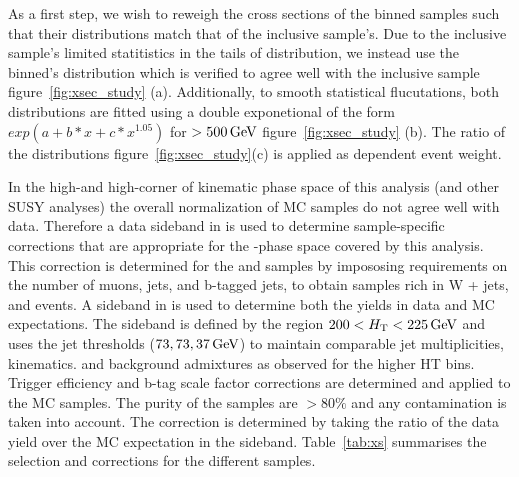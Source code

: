 
As a first step, we wish to reweigh the cross sections of the \partonht binned samples such that
their \partonht distributions match that of the inclusive sample's. Due to
the inclusive sample's limited statitistics in the tails of \scalht distribution, 
we instead use the \nparton binned's \partonht distribution which is verified to agree well 
with the inclusive sample figure~\ref{fig:xsec_study} (a).  Additionally, to smooth statistical
flucutations, both distributions are fitted using a double exponetional of the form $exp(a+b*x + c*x^{1.05})$
for \scalht $> 500\,\text{Ge\hspace{-.08em}V}$ figure~\ref{fig:xsec_study} (b). The ratio of the distributions figure~\ref{fig:xsec_study}(c) 
is applied as \partonht dependent event weight.

In the high-\scalht and high-\met corner of kinematic phase space of this analysis 
(and other SUSY analyses) the overall normalization of MC samples do not 
agree well with data. Therefore a data sideband in \scalht is used
to determine sample-specific corrections that are appropriate for the
\scalht-\met phase space covered by this analysis. This correction is determined 
for the \wlnu and \ttbar samples by impososing requirements on the number of muons, 
jets, and b-tagged jets, to obtain samples rich in W + jets, and \ttbar events.
A sideband in \scalht is used to determine both the yields in data and
MC expectations. The sideband is defined by the region $200 < \mbox{$H_\text{T}$}
< 225\,\text{Ge\hspace{-.08em}V}$ and uses the jet \pt thresholds ($73,73,37\,\text{Ge\hspace{-.08em}V}$) to maintain 
comparable jet multiplicities, kinematics. and background admixtures as observed for the
higher HT bins. Trigger efficiency and b-tag scale factor corrections 
are determined and applied to the MC samples. The purity of the samples are $>80\%$ and
any contamination is taken into account. The correction is determined by 
taking the ratio of the data yield over the MC expectation in the sideband. 
Table~\ref{tab:xs} summarises the selection and corrections for the different samples. 

